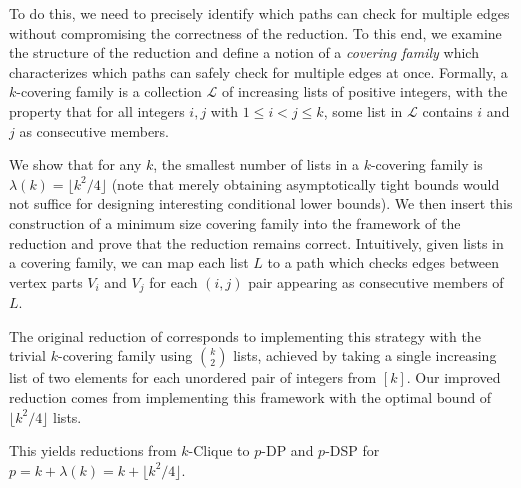 \documentclass[11pt]{article}
\newcommand{\grp}[1]{\left(#1\right)}
\theoremstyle{definition}
\begin{document}
To do this, we need to precisely identify which paths can check for multiple edges without compromising the correctness of the reduction. 
To this end, we examine the structure of the reduction and define a notion of a \emph{covering family} which characterizes which paths can safely check for multiple edges at once. 
Formally, a $k$-covering family is a collection $\mathcal{L}$ of increasing lists of positive integers, with the property that for all integers $i,j$ with $1\le i < j\le k$, some list in $\mathcal{L}$ contains $i$ and $j$ as consecutive members.

We show that for any $k$, the smallest number of lists in a $k$-covering family is $\lambda(k)  = \lfloor k^2/4\rfloor$ (note that merely obtaining asymptotically tight bounds would not suffice for designing interesting conditional lower bounds). 
We then insert this construction of a minimum size covering family into the framework of the reduction and prove that the reduction remains correct. 
Intuitively, given lists in a covering family, we can map each list $L$ to a path  which checks edges between vertex parts $V_i$ and $V_j$ for each $(i,j)$ pair appearing as consecutive members of $L$.

The original reduction of \cite{Slivkins2010} corresponds to implementing this strategy with the trivial $k$-covering family using $\binom{k}{2}$ lists, achieved by taking a single increasing list of two elements for each unordered pair of integers from $[k]$.
Our improved reduction comes from implementing this framework with the optimal bound of $\lfloor k^2/4\rfloor$ lists.

This yields reductions from \textsf{$k$-Clique} to \textsf{$p$-DP} and \textsf{$p$-DSP} for $p= k + \lambda(k) = k + \lfloor k^2/4\rfloor$.




\end{document}
